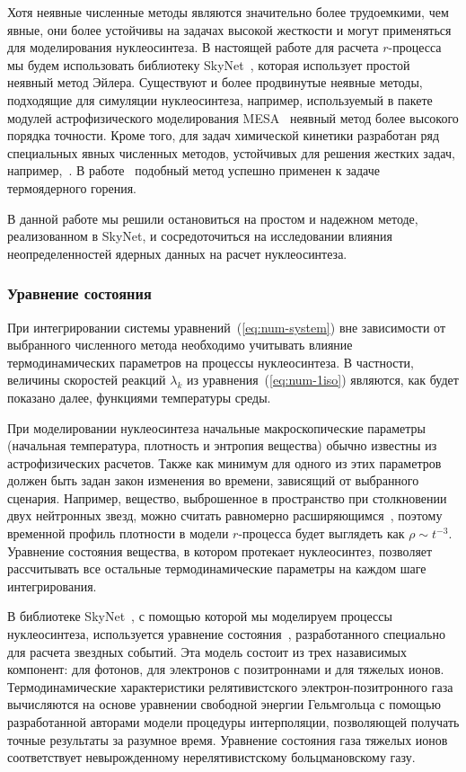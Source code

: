 Хотя неявные численные методы являются значительно более трудоемкими, чем явные, они более устойчивы на задачах высокой жесткости и могут применяться для моделирования нуклеосинтеза. В настоящей работе для расчета $r$-процесса мы будем использовать библиотеку SkyNet~\cite{lippuner2017}, которая использует простой неявный метод Эйлера. Существуют и более продвинутые неявные методы, подходящие для симуляции нуклеосинтеза, например, используемый в пакете модулей астрофизического моделирования MESA~\cite{paxton2011} неявный метод более высокого порядка точности. Кроме того, для задач химической кинетики разработан ряд специальных явных численных методов, устойчивых для решения жестких задач, например,~\cite{bulatov2018}. В работе~\cite{guidry2013} подобный метод успешно применен к задаче термоядерного горения.

В данной работе мы решили остановиться на простом и надежном методе, реализованном в SkyNet, и сосредоточиться на исследовании влияния неопределенностей ядерных данных на расчет нуклеосинтеза.

\subsubsection{Уравнение состояния }
При интегрировании системы уравнений~(\ref{eq:num-system}) вне зависимости от выбранного численного метода необходимо учитывать влияние термодинамических параметров на процессы нуклеосинтеза. В частности, величины скоростей реакций $\lambda_k$ из уравнения~(\ref{eq:num-1iso}) являются, как будет показано далее, функциями температуры среды. 

При моделировании нуклеосинтеза начальные макроскопические параметры (начальная температура, плотность и энтропия вещества) обычно известны из астрофизических расчетов. Также как минимум для одного из этих параметров должен быть задан закон изменения во времени, зависящий от выбранного сценария. Например, вещество, выброшенное в пространство при столкновении двух нейтронных звезд, можно считать равномерно расширяющимся~\cite{korobkin2012}, поэтому временной профиль плотности в модели $r$-процесса будет выглядеть как $\rho \sim t^{-3}$. Уравнение состояния вещества, в котором протекает нуклеосинтез, позволяет рассчитывать все остальные термодинамические параметры на каждом шаге интегрирования.

В библиотеке SkyNet~\cite{lippuner2017}, с помощью которой мы моделируем процессы нуклеосинтеза, используется уравнение состояния~\cite{timmes1999,timmes2000}, разработанного специально для расчета звездных событий. Эта модель состоит из трех назависимых компонент: для фотонов, для электронов с позитроннами и для тяжелых ионов. Термодинамические характеристики релятивистского электрон-позитронного газа вычисляются на основе уравнении свободной энергии Гельмгольца с помощью разработанной авторами модели процедуры интерполяции, позволяющей получать точные результаты за разумное время. Уравнение состояния газа тяжелых ионов соответствует невырожденному нерелятивистскому больцмановскому газу.

